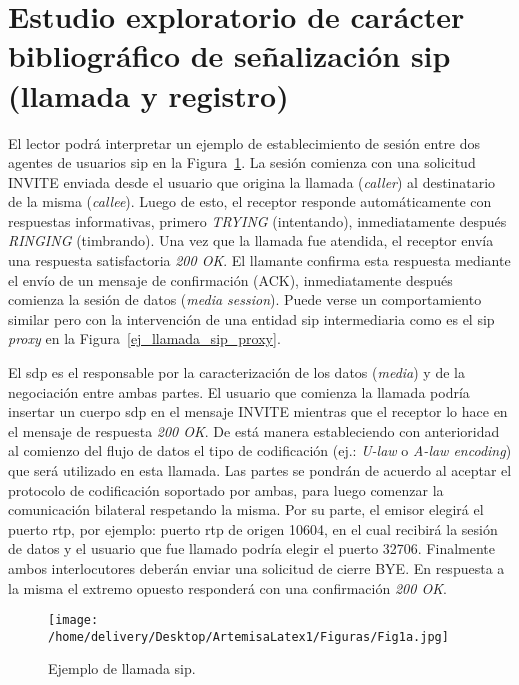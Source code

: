 \documentclass[a4paper,12pt]{report}
\begin{document}
\pagebreak

\section{Estudio exploratorio de carácter bibliográfico de señalización \ac{sip} (llamada y registro)}
\label{llamada_y_reg_sip}

El lector podrá interpretar un ejemplo de establecimiento de sesión entre dos
agentes de usuarios \ac{sip} en la Figura~\ref{ej_llamada_sip}. 
La sesión comienza con una solicitud INVITE enviada desde el
usuario que origina la llamada (\emph{caller}) al destinatario de la misma
(\emph{callee}). Luego de esto, el receptor responde automáticamente con
respuestas informativas, primero \emph{TRYING} (intentando),
inmediatamente después \emph{RINGING} (timbrando). Una vez que la
llamada fue atendida, el receptor envía una respuesta satisfactoria
\emph{200 OK}. El llamante confirma  esta respuesta mediante el envío
de un mensaje de confirmación (ACK), inmediatamente después
comienza la sesión de datos (\emph{media session}). Puede verse un comportamiento similar
pero con la intervención de una entidad \ac{sip} intermediaria como es el 
\ac{sip} \emph{proxy} en la Figura~\ref{ej_llamada_sip_proxy}. 

El \ac{sdp} es el responsable por la caracterización de los datos (\emph{media}) y de la
negociación entre ambas partes. El usuario que comienza la llamada podría
insertar un cuerpo \ac{sdp} en el mensaje INVITE mientras que el receptor lo hace en el
mensaje de respuesta \emph{200 OK}. De está manera estableciendo con anterioridad al
comienzo del flujo de datos el tipo de codificación (ej.: \emph{U-law} o
\emph{A-law encoding}) que será utilizado en esta llamada. 
Las partes se pondrán de acuerdo al aceptar el protocolo de
codificación soportado por ambas, para luego comenzar la comunicación bilateral
respetando la misma. Por su parte, el emisor elegirá el puerto \ac{rtp}, 
por ejemplo: puerto \ac{rtp} de origen 10604, en el cual
recibirá la sesión de datos y el usuario que fue llamado podría elegir el
puerto 32706. Finalmente ambos interlocutores deberán enviar una solicitud de
cierre BYE. En respuesta a la misma el extremo opuesto
responderá con una confirmación \emph{200 OK}.  

\begin{figure}[h!] 
\centering
\texttt{[image: /home/delivery/Desktop/ArtemisaLatex1/Figuras/Fig1a.jpg]}
\caption{Ejemplo de llamada \ac{sip}.}
\label{ej_llamada_sip}
\end{figure}
\end{document}
